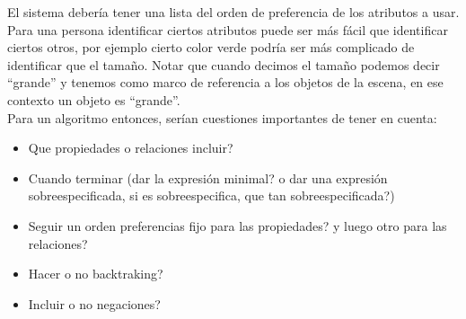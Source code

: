 El sistema deber\'ia tener una lista del orden de preferencia de los atributos a usar.\\ 

Para una persona identificar ciertos atributos puede ser m\'as f\'acil que identificar ciertos otros, por ejemplo cierto color verde podr\'{i}a ser m\'as complicado de identificar que el tama\~no. Notar que cuando decimos el tama\~no podemos decir ``grande'' y tenemos como marco de referencia a los objetos de la escena, en ese contexto un objeto es ``grande''.\\

Para un algoritmo entonces, ser\'ian cuestiones importantes de tener en cuenta:

\begin{itemize}
 \item Que propiedades o relaciones incluir?
 \item Cuando terminar (dar la expresi\'on minimal? o dar una expresi\'on sobreespecificada, si es sobreespecifica, que tan sobreespecificada?)
 \item Seguir un orden preferencias fijo para las propiedades? y luego otro para las relaciones?
 \item Hacer o no backtraking?
 \item Incluir o no negaciones?
\end{itemize}
